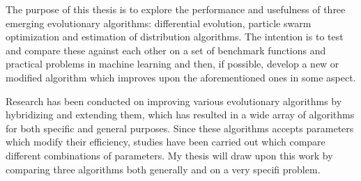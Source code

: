 The purpose of this thesis is to explore the performance and usefulness of three emerging evolutionary algorithms: differential evolution, particle swarm optimization and estimation of distribution algorithms. The intention is to test and compare these against each other on a set of benchmark functions and practical problems in machine learning and then, if possible, develop a new or modified algorithm which improves upon the aforementioned ones in some aspect.

Research has been conducted on improving various evolutionary algorithms by hybridizing and extending them, which has resulted in a wide array of algorithms for both specific and general purposes. Since these algorithms accepts parameters which modify their efficiency, studies have been carried out which compare different combinations of parameters. My thesis will draw upon this work by comparing three algorithms both generally and on a very specifi problem.
